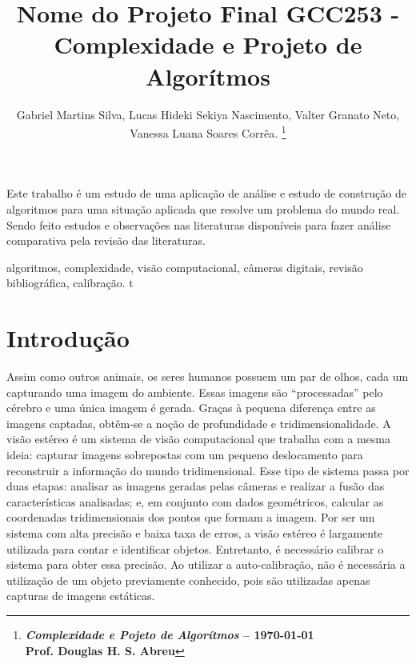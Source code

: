 \documentclass[portuguese]{sbrt}
\begin{document}
 
  
\title{Nome do Projeto Final GCC253 - Complexidade e Projeto de Algorítmos} 
  
\author{Gabriel Martins Silva, Lucas Hideki Sekiya Nascimento, Valter Granato Neto, Vanessa Luana Soares Corrêa. 
\thanks{\centering \textbf{\textit{Complexidade e Pojeto de Algorítmos} -- \today \\ Prof. Douglas H. S. Abreu}}%
} 
  
\maketitle 

  
  
  
  
\begin{resumo} 
Este trabalho é um estudo de uma aplicação de análise e estudo de construção de algoritmos para uma situação aplicada que resolve um problema do mundo real. Sendo feito estudos e observações nas literaturas disponíveis para fazer análise comparativa pela revisão das literaturas.  
\end{resumo} 
\begin{chave} 
algoritmos, complexidade, visão computacional, câmeras digitais, revisão bibliográfica, calibração. t 
\end{chave} 
  

  
  

\section{Introdução} 
\label{sec:introducao} 
  
Assim como outros animais, os seres humanos possuem um par de olhos, cada um capturando uma imagem do ambiente. Essas imagens são “processadas” pelo cérebro e uma única imagem é gerada. Graças à pequena diferença entre as imagens captadas, obtêm-se a noção de profundidade e tridimensionalidade. A visão estéreo é um sistema de visão computacional que trabalha com a mesma ideia: capturar imagens sobrepostas com um pequeno deslocamento para reconstruir a informação do mundo tridimensional.
Esse tipo de sistema passa por duas etapas: analisar as imagens geradas pelas câmeras e realizar a fusão das características analisadas; e, em conjunto com dados geométricos, calcular as coordenadas tridimensionais dos pontos que formam a imagem.
Por ser um sistema com alta precisão e baixa taxa de erros, a visão estéreo é largamente utilizada para contar e identificar objetos. Entretanto, é necessário calibrar o sistema para obter essa precisão. Ao utilizar a auto-calibração, não é necessária a utilização de um objeto previamente conhecido, pois são utilizadas apenas capturas de imagens estáticas.
~\cite{cormen:2009}
\end{document}
